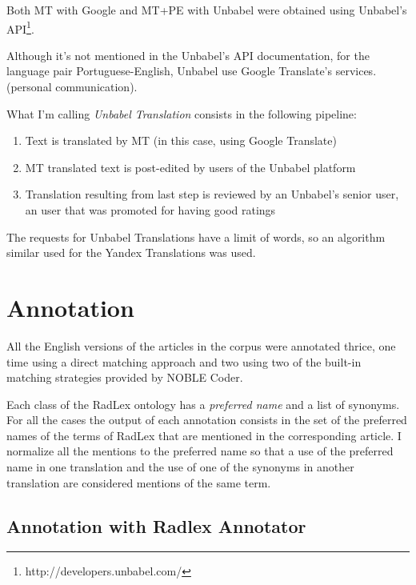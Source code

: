 Both MT with Google and MT+PE with Unbabel were obtained using Unbabel's API\footnote{http://developers.unbabel.com/}. 

Although it's not mentioned in the Unbabel's API documentation, for the language pair Portuguese-English, Unbabel use Google Translate's services. (personal communication).

What I'm calling \textit{Unbabel Translation} consists in the following pipeline:

\begin{enumerate}
\item Text is translated by MT (in this case, using Google Translate)
\item MT translated text is post-edited by users of the Unbabel platform 
\item Translation resulting from last step is reviewed by an Unbabel's senior user, an user that was promoted for having good ratings
\end{enumerate}

The requests for Unbabel Translations have a limit of words, so an algorithm similar used for the Yandex Translations was used. 

\section{Annotation}

All the English versions of the articles in the corpus were annotated thrice, one time using a direct matching approach and two using two of the built-in matching strategies provided by NOBLE Coder. 

Each class of the RadLex ontology has a \textit{preferred name} and a list of synonyms. For all the cases the output of each annotation consists in the set of the preferred names of the terms of RadLex that are mentioned in the corresponding article. I normalize all the mentions to the preferred name so that a use of the preferred name in one translation and the use of one of the synonyms in another translation are considered mentions of the same term. 

\subsection{Annotation with Radlex Annotator}

